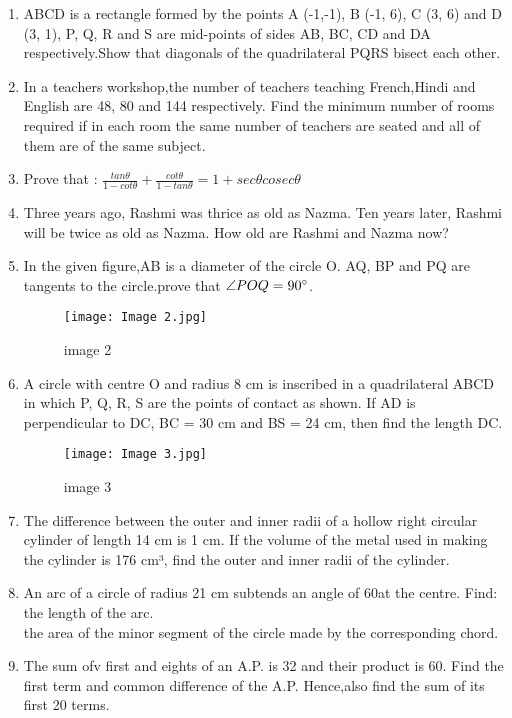 \documentclass{article}
\begin{document}
\begin{enumerate}
\item ABCD is a rectangle formed by the points A (-1,-1), B (-1, 6), C (3, 6) and D (3, 1), P, Q, R and S are mid-points of sides AB, BC, CD and DA respectively.Show that diagonals of the quadrilateral PQRS bisect each other.
\item\text{} In a teachers workshop,the number of teachers teaching French,Hindi and English are 48, 80 and 144 respectively. Find the minimum number of rooms required if in each room the same number of teachers are seated and all of them are of the same subject.
\item Prove that : $\frac{tan{\theta}}{1-cot{\theta}} + \frac{cot{\theta}}{1-tan{\theta}} = 1 + sec\theta cosec\theta$
\item Three years ago, Rashmi was thrice as old as Nazma. Ten years later, Rashmi will be twice as old as Nazma. How old are Rashmi and Nazma now?
\item In the given figure,AB is a diameter of the circle O. AQ, BP and PQ are tangents to the circle.prove that $\angle POQ = 90\degree$.
\begin{figure}[h!]
\centering
\texttt{[image: Image 2.jpg]}
\label{fig:Image 2}
\caption{image 2}
\end{figure}
\newpage
\item  A circle with centre O and radius 8 cm is inscribed in a quadrilateral ABCD in which P, Q, R, S are the points of contact as shown. If AD is perpendicular to DC, BC = 30 cm and BS = 24 cm, then find the length DC.
\begin{figure}[h!]
\centering
\texttt{[image: Image 3.jpg]}
\label{fig:Image 3}
\caption{image 3}
\end{figure}
\item The difference between the outer and inner radii of a hollow right circular cylinder of length 14 cm is 1 cm. If the volume of the metal used in making the cylinder is 176 cm³, find the outer and inner radii of the cylinder.
\newpage
\item An arc of a circle of radius 21 cm subtends an angle of 60\textdegree at the centre. Find:\\
 the length of the arc.\\
 the area of the minor segment of the circle made by the corresponding chord. 
\item  The sum ofv first and eights of an A.P. is 32 and their product is 60. Find the first term  and common difference of the A.P. Hence,also find the sum of its first 20 terms.

\end{enumerate}
\end{document}
